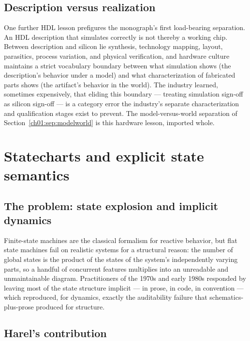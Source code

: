 \subsection{Description versus realization}\label{ch02:hdl:realization}

One further HDL lesson prefigures the monograph's first load-bearing
separation. An HDL description that
simulates correctly is not thereby a working chip. Between description and
silicon lie synthesis, technology mapping, layout, parasitics, process
variation, and physical verification, and hardware culture maintains a
strict vocabulary boundary between what simulation shows (the description's
behavior under a model) and what characterization of fabricated parts shows
(the artifact's behavior in the world). The industry learned, sometimes
expensively, that eliding this boundary --- treating simulation sign-off as
silicon sign-off --- is a category error the industry's separate
characterization and qualification stages exist to prevent.
The model-versus-world separation of
Section~\ref{ch01:sep:modelworld} is this hardware lesson, imported whole.

\section{Statecharts and explicit state semantics}\label{ch02:statecharts}

\subsection{The problem: state explosion and implicit dynamics}\label{ch02:statecharts:problem}

Finite-state machines are the classical formalism for reactive behavior,
but flat state machines fail on realistic systems for a structural reason:
the number of global states is the product of the states of the system's
independently varying parts, so a handful of concurrent features multiplies
into an unreadable and unmaintainable diagram. Practitioners of the 1970s
and early 1980s responded by leaving most of the state structure implicit
--- in prose, in code, in convention --- which reproduced, for dynamics,
exactly the auditability failure that schematics-plus-prose produced for
structure.

\subsection{Harel's contribution}\label{ch02:statecharts:harel}

